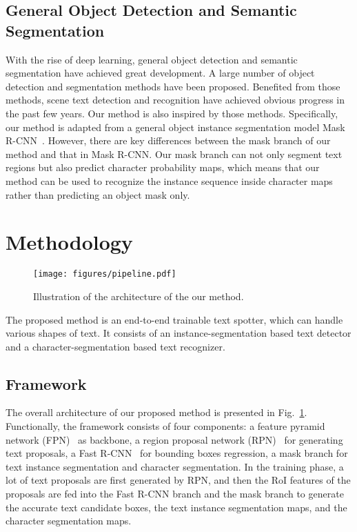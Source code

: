 \documentclass[runningheads]{llncs}
\begin{document}
\subsection{General Object Detection and Semantic Segmentation}

With the rise of deep learning, general object detection and semantic segmentation have achieved great development. A large number of object detection and segmentation  methods \cite{girshick2014rich,fastrcnn,ren2015faster,dai2016r,lin2017feature,liu2016ssd,redmon2016you,long2015fully,dai2016instance,li2017fully,he2017mask} have been proposed. Benefited from those methods, scene text detection and recognition have achieved obvious progress in the past few years. Our method is also inspired by those methods. Specifically, our method is adapted from a general object instance segmentation model Mask R-CNN~\cite{he2017mask}. However, there are key differences between the mask branch of our method and that in Mask R-CNN. Our mask branch can not only segment text regions but also predict character probability maps, which means that our method can be used to recognize the instance sequence inside character maps rather than predicting an object mask only.

\section{Methodology}
\begin{figure}[!b]
\begin{center}
\texttt{[image: figures/pipeline.pdf]}
\end{center}
\caption{Illustration of the architecture of the our method.}
\label{fig:pipeline}
\end{figure}

The proposed method is an end-to-end trainable text spotter, which can handle various shapes of text. It consists of an instance-segmentation based text detector and a character-segmentation based text recognizer.
\subsection{Framework}\label{sec:framework}

The overall architecture of our proposed method is presented in Fig.~\ref{fig:pipeline}. Functionally, the framework consists of four components: a feature pyramid network (FPN)~\cite{lin2017feature} as backbone, a region proposal network (RPN)~\cite{ren2015faster} for generating text proposals, a Fast R-CNN~\cite{ren2015faster} for bounding boxes regression, a mask branch for text instance segmentation and character segmentation. 
In the training phase, a lot of text proposals are first generated by RPN, and then the RoI features of the proposals are fed into the Fast R-CNN branch and the mask branch to generate the accurate text candidate boxes, the text instance segmentation maps, and the character segmentation maps.
\end{document}
